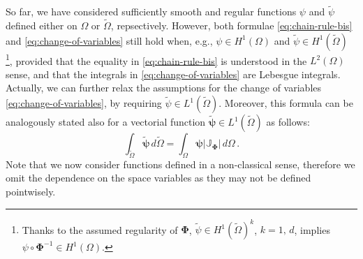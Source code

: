 \documentclass[12pt, a4paper, twoside, openright, notitlepage]{report}
\numberwithin{equation}{chapter}
\theoremstyle{theorem}
\theoremstyle{definition}
\theoremstyle{remark}
\theoremstyle{proposition}
\numberwithin{figure}{chapter}
\newcommand{\wt}[1]{\widetilde{#1}}
\newcommand{\bg}[1]{\boldsymbol{#1}}
\begin{document}
		So far, we have considered sufficiently smooth and regular functions $\psi$ and $\wt{\psi}$ defined either on $\Omega$ or $\wt{\Omega}$, repsectively. However, both formulae \eqref{eq:chain-rule-bis} and \eqref{eq:change-of-variables} still hold when, e.g., $\psi \in H^1(\Omega)$ and $\wt{\psi} \in H^1(\wt{\Omega})$ \footnote{Thanks to the assumed regularity of $\bg{\Phi}$, $\wt{\psi} \in H^1(\wt{\Omega})^k$, $k = 1, \, d$, implies $\psi \circ \bg{\Phi}^{-1} \in H^1(\Omega)$.}, provided that the equality in \eqref{eq:chain-rule-bis} is understood in the $L^2(\Omega)$ sense, and that the integrals in \eqref{eq:change-of-variables} are Lebesgue integrals. Actually, we can further relax the assumptions for the change of variables \eqref{eq:change-of-variables}, by requiring $\wt{\psi} \in L^1(\wt{\Omega})$. Moreover, this formula can be analogously stated also for a vectorial function $\wt{\bg{\psi}} \in L^1(\wt{\Omega})$ as follows:
		\begin{equation}
			\label{eq:change-of-variables-vectorial}
			\int_{\wt{\Omega}} \wt{\bg{\psi}} \, d \wt{\Omega} = \int_{\Omega} \bg{\psi} \lvert \mathbb{J}_{\bg{\Phi}} \rvert \, d \Omega \, .
		\end{equation}
		Note that we now consider functions defined in a non-classical sense, therefore we omit the dependence on the space variables as they may not be defined pointwisely.
		
\end{document}
